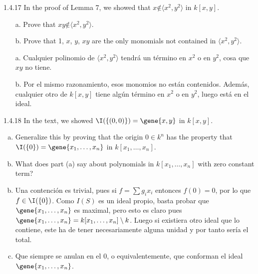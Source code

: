 \documentclass[twoside]{article}
\begin{document}
\newpage

\begin{ejercicio}{1.4.17}
In the proof of Lemma 7, we showed that $x \not∈ 
\langle x^2, y^2\rangle$ in $k[x, y]$.
\begin{itemize}
\item[a.] Prove that $xy \not∈ 
\langle x^2, y^2\rangle$.
\item[b.] Prove that 1, $x$, $y$, $xy$ are the only monomials not contained in 
$\langle x^2, y^2\rangle$.
\end{itemize}
\end{ejercicio}
\begin{solucion}
\begin{itemize}
\item[a.] Cualquier polinomio de $\langle x^2, y^2\rangle$ tendrá un término en $x^2$ o en $y^2$, cosa que $xy$ no tiene. 
\item[b.] Por el mismo razonamiento, esos monomios no están contenidos. Además, cualquier otro de $k[x,y]$ tiene algún término en $x^2$ o en $y^2$, luego está en el ideal. 
\end{itemize}
\end{solucion}

\newpage

\begin{ejercicio}{1.4.18}
In the text, we showed $\I(\{(0,0)\}) = \gene{x,y}$ in $k[x,y]$. 
\begin{enumerate}[a.]
\item Generalize this by proving that the origin $0\in k^n$ has the property that $\I(\{0\}) = \gene{x_1,\dotsc,x_n}$ in $k[x_1,\dotsc,x_n]$.
\item What does part (a) say about polynomials in $k[x_1,\dotsc,x_n]$ with zero constant term?
\end{enumerate}
\end{ejercicio}
\begin{solucion}
\begin{enumerate}[a.]
\item[]
\item Una contención es trivial, pues si $f= \sum g_i x_i$ entonces  $f(0)=0$, por lo que $f\in \I(\{0\})$. Como $I(S)$ es un ideal propio, basta probar que $\gene{x_1,\dotsc,x_n}$ es maximal, pero esto es claro pues $\gene{x_1,\dotsc,x_n} = k[x_1,\dotsc,x_n]\setminus k$. Luego si existiera otro ideal que lo contiene, este ha de tener necesariamente alguna unidad y por tanto sería el total.
\item Que siempre se anulan en el 0, o equivalentemente, que conforman el ideal $\gene{x_1,\dotsc,x_n}$.

\end{enumerate}
\end{solucion}
\end{document}
